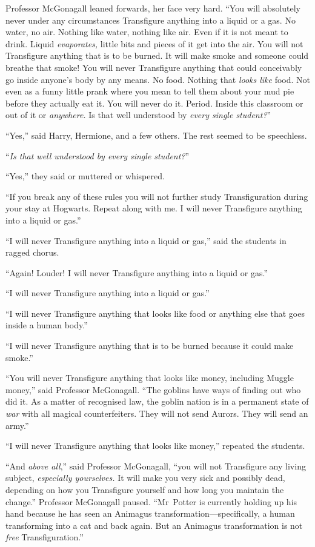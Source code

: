 Professor McGonagall leaned forwards, her face very hard. “You will absolutely never under any circumstances Transfigure anything into a liquid or a gas. No water, no air. Nothing like water, nothing like air. Even if it is not meant to drink. Liquid \emph{evaporates,} little bits and pieces of it get into the air. You will not Transfigure anything that is to be burned. It will make smoke and someone could breathe that smoke! You will never Transfigure anything that could conceivably go inside anyone’s body by any means. No food. Nothing that \emph{looks like} food. Not even as a funny little prank where you mean to tell them about your mud pie before they actually eat it. You will never do it. Period. Inside this classroom or out of it or \emph{anywhere.} Is that well understood by \emph{every single student?}”

“Yes,” said Harry, Hermione, and a few others. The rest seemed to be speechless.

“\emph{Is that well understood by every single student?}”

“Yes,” they said or muttered or whispered.

“If you break any of these rules you will not further study Transfiguration during your stay at Hogwarts. Repeat along with me. I will never Transfigure anything into a liquid or gas.”

“I will never Transfigure anything into a liquid or gas,” said the students in ragged chorus.

“Again! Louder! I will never Transfigure anything into a liquid or gas.”

“I will never Transfigure anything into a liquid or gas.”

“I will never Transfigure anything that looks like food or anything else that goes inside a human body.”

“I will never Transfigure anything that is to be burned because it could make smoke.”

“You will never Transfigure anything that looks like money, including Muggle money,” said Professor McGonagall. “The goblins have ways of finding out who did it. As a matter of recognised law, the goblin nation is in a permanent state of \emph{war} with all magical counterfeiters. They will not send Aurors. They will send an army.”

“I will never Transfigure anything that looks like money,” repeated the students.

“And \emph{above all},” said Professor McGonagall, “you will not Transfigure any living subject, \emph{especially yourselves.} It will make you very sick and possibly dead, depending on how you Transfigure yourself and how long you maintain the change.” Professor McGonagall paused. “Mr~Potter is currently holding up his hand because he has seen an Animagus transformation—specifically, a human transforming into a cat and back again. But an Animagus transformation is not \emph{free} Transfiguration.”

